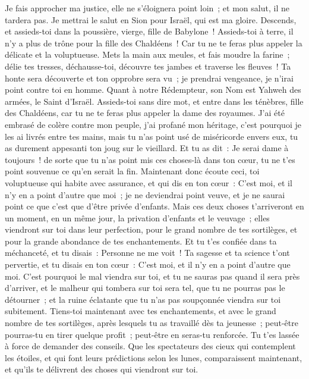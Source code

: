 \begin{multicols}{2}
Je fais approcher ma justice, elle ne s'éloignera point loin~; et mon salut, il ne tardera pas. Je mettrai le salut en Sion pour Israël, qui est ma gloire.
\VerseOne{}Descends, et assieds-toi dans la poussière, vierge, fille de Babylone~! Assieds-toi à terre, il n'y a plus de trône pour la fille des Chaldéens~! Car tu ne te feras plus appeler la délicate et la voluptueuse.
Mets la main aux meules, et fais moudre la farine~; délie tes tresses, déchausse-toi, découvre tes jambes et traverse les fleuves~!
Ta honte sera découverte et ton opprobre sera vu~; je prendrai vengeance, je n'irai point contre toi en homme.
Quant à notre Rédempteur, son Nom est Yahweh des armées, le Saint d'Israël.
Assieds-toi sans dire mot, et entre dans les ténèbres, fille des Chaldéens, car tu ne te feras plus appeler la dame des royaumes.
J'ai été embrasé de colère contre mon peuple, j'ai profané mon héritage, c'est pourquoi je les ai livrés entre tes mains, mais tu n'as point usé de miséricorde envers eux, tu as durement appesanti ton joug sur le vieillard.
Et tu as dit~: Je serai dame à toujours~! de sorte que tu n'as point mis ces choses-là dans ton cœur, tu ne t'es point souvenue ce qu'en serait la fin.
Maintenant donc écoute ceci, toi voluptueuse qui habite avec assurance, et qui dis en ton cœur~: C'est moi, et il n'y en a point d'autre que moi~; je ne deviendrai point veuve, et je ne saurai point ce que c'est que d'être privée d'enfants.
Mais ces deux choses t'arriveront en un moment, en un même jour, la privation d'enfants et le veuvage~; elles viendront sur toi dans leur perfection, pour le grand nombre de tes sortilèges, et pour la grande abondance de tes enchantements.
Et tu t'es confiée dans ta méchanceté, et tu disais~: Personne ne me voit~! Ta sagesse et ta science t'ont pervertie, et tu disais en ton cœur~: C'est moi, et il n'y en a point d'autre que moi.
 C'est pourquoi le mal viendra sur toi, et tu ne sauras pas quand il sera près d'arriver, et le malheur qui tombera sur toi sera tel, que tu ne pourras pas le détourner~; et la ruine éclatante que tu n'as pas soupçonnée viendra sur toi subitement.
Tiens-toi maintenant avec tes enchantements, et avec le grand nombre de tes sortilèges, après lesquels tu as travaillé dès ta jeunesse~; peut-être pourras-tu en tirer quelque profit~; peut-être en seras-tu renforcée.
Tu t'es lassée à force de demander des conseils. Que les spectateurs des cieux qui contemplent les étoiles, et qui font leurs prédictions selon les lunes, comparaissent maintenant, et qu'ils te délivrent des choses qui viendront sur toi.

\end{multicols}
